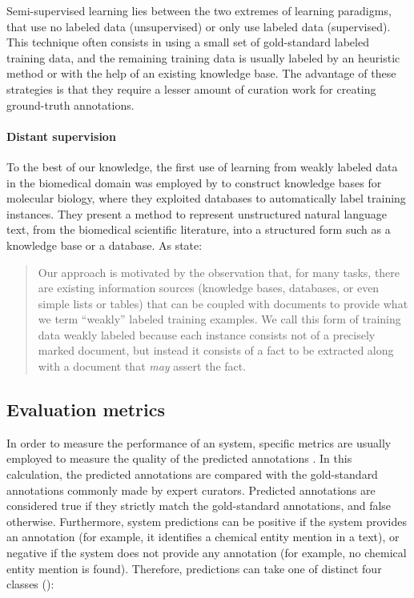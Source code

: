 Semi-supervised learning lies between the two extremes of learning paradigms, that use no labeled data (unsupervised) or only use labeled data (supervised).
This technique often consists in using a small set of gold-standard labeled training data, and the remaining training data is usually labeled by an heuristic method or with the help of an existing knowledge base.
The advantage of these strategies is that they require a lesser amount of curation work for creating ground-truth annotations.


\paragraph{Distant supervision}

To the best of our knowledge, the first use of learning from weakly labeled data in the biomedical domain was employed by \textcite{craven1999a} to construct knowledge bases for molecular biology, where they exploited databases to automatically label training instances.
They present a method to represent unstructured natural language text, from the  biomedical scientific literature, into a structured form such as a knowledge base or a database.
As \textcite{craven1999a} state:

\blockquote{%
Our approach is motivated by the observation that, for many  tasks, there are existing information sources (knowledge bases, databases, or even simple lists or tables) that can be coupled with documents to provide what we term ``weakly'' labeled training examples.
We call this form of training data weakly labeled because each instance consists not of a precisely marked document, but instead it consists of a fact to be extracted along with a document that \emph{may} assert the fact.
}


\subsection{Evaluation metrics}

In order to measure the performance of an  system, specific metrics are usually employed to measure the quality of the predicted annotations \parencite{chinchor1993a,fawcett2006a,dalianis2018a}.
In this calculation, the predicted annotations are compared with the gold-standard annotations commonly made by expert curators.
Predicted annotations are considered true if they strictly match the gold-standard annotations, and false otherwise.
Furthermore, system predictions can be positive if the system provides an annotation (for example, it identifies a chemical entity mention in a text), or negative if the system does not provide any annotation (for example, no chemical entity mention is found).
Therefore, predictions can take one of distinct four classes ():

